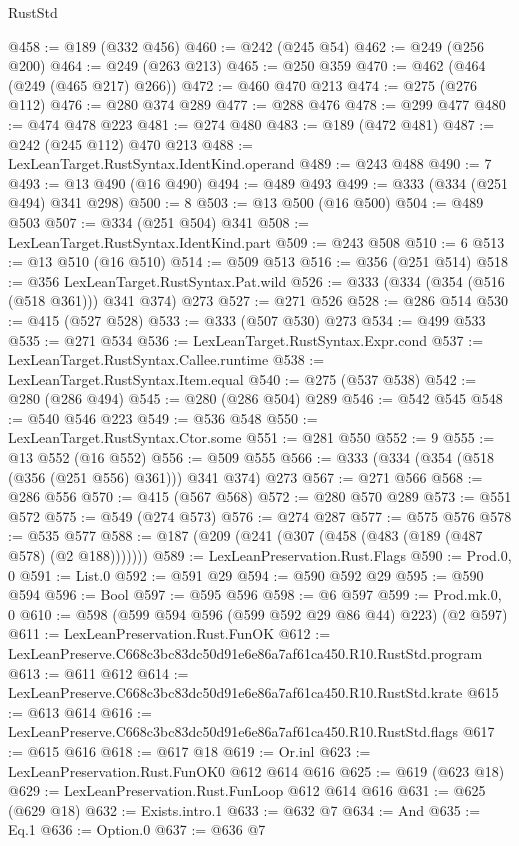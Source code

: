 \begin{lexlean}{RustStd}
\begin{coremodule}
@458 := @189 (@332 @456)
@460 := @242 (@245 @54)
@462 := @249 (@256 @200)
@464 := @249 (@263 @213)
@465 := @250 @359
@470 := @462 (@464 (@249 (@465 @217) @266))
@472 := @460 @470 @213
@474 := @275 (@276 @112)
@476 := @280 @374 @289
@477 := @288 @476
@478 := @299 @477
@480 := @474 @478 @223
@481 := @274 @480
@483 := @189 (@472 @481)
@487 := @242 (@245 @112) @470 @213
@488 := LexLeanTarget.RustSyntax.IdentKind.operand
@489 := @243 @488
@490 := 7
@493 := @13 @490 (@16 @490)
@494 := @489 @493
@499 := @333 (@334 (@251 @494) @341 @298)
@500 := 8
@503 := @13 @500 (@16 @500)
@504 := @489 @503
@507 := @334 (@251 @504) @341
@508 := LexLeanTarget.RustSyntax.IdentKind.part
@509 := @243 @508
@510 := 6
@513 := @13 @510 (@16 @510)
@514 := @509 @513
@516 := @356 (@251 @514)
@518 := @356 LexLeanTarget.RustSyntax.Pat.wild
@526 := @333 (@334 (@354 (@516 (@518 @361))) @341 @374) @273
@527 := @271 @526
@528 := @286 @514
@530 := @415 (@527 @528)
@533 := @333 (@507 @530) @273
@534 := @499 @533
@535 := @271 @534
@536 := LexLeanTarget.RustSyntax.Expr.cond
@537 := LexLeanTarget.RustSyntax.Callee.runtime
@538 := LexLeanTarget.RustSyntax.Item.equal
@540 := @275 (@537 @538)
@542 := @280 (@286 @494)
@545 := @280 (@286 @504) @289
@546 := @542 @545
@548 := @540 @546 @223
@549 := @536 @548
@550 := LexLeanTarget.RustSyntax.Ctor.some
@551 := @281 @550
@552 := 9
@555 := @13 @552 (@16 @552)
@556 := @509 @555
@566 := @333 (@334 (@354 (@518 (@356 (@251 @556) @361))) @341 @374) @273
@567 := @271 @566
@568 := @286 @556
@570 := @415 (@567 @568)
@572 := @280 @570 @289
@573 := @551 @572
@575 := @549 (@274 @573)
@576 := @274 @287
@577 := @575 @576
@578 := @535 @577
@588 := @187 (@209 (@241 (@307 (@458 (@483 (@189 (@487 @578) (@2 @188)))))))
@589 := LexLeanPreservation.Rust.Flags
@590 := Prod.{0, 0}
@591 := List.{0}
@592 := @591 @29
@594 := @590 @592 @29
@595 := @590 @594
@596 := Bool
@597 := @595 @596
@598 := @6 @597
@599 := Prod.mk.{0, 0}
@610 := @598 (@599 @594 @596 (@599 @592 @29 @86 @44) @223) (@2 @597)
@611 := LexLeanPreservation.Rust.FunOK
@612 := LexLeanPreserve.C668c3bc83dc50d91e6e86a7af61ca450.R10.RustStd.program
@613 := @611 @612
@614 := LexLeanPreserve.C668c3bc83dc50d91e6e86a7af61ca450.R10.RustStd.krate
@615 := @613 @614
@616 := LexLeanPreserve.C668c3bc83dc50d91e6e86a7af61ca450.R10.RustStd.flags
@617 := @615 @616
@618 := @617 @18
@619 := Or.inl
@623 := LexLeanPreservation.Rust.FunOK0 @612 @614 @616
@625 := @619 (@623 @18)
@629 := LexLeanPreservation.Rust.FunLoop @612 @614 @616
@631 := @625 (@629 @18)
@632 := Exists.intro.{1}
@633 := @632 @7
@634 := And
@635 := Eq.{1}
@636 := Option.{0}
@637 := @636 @7

\end{coremodule}
\end{lexlean}
